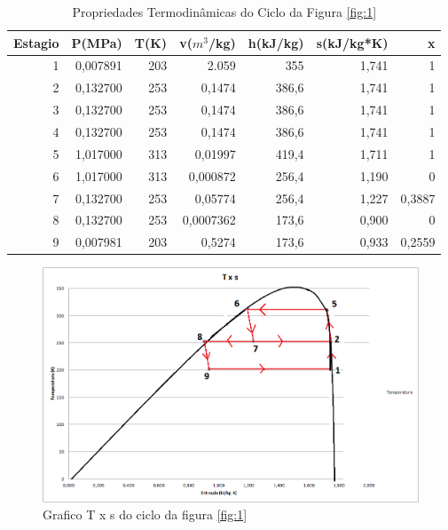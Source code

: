 \documentclass[a4paper, 12pt]{article}
\begin{document}
\begin{table}[htbp]
  \centering
  \caption{ Propriedades Termodinâmicas do Ciclo da Figura \ref{fig:1}}
    \begin{tabular}{rrrrrrr}
    \toprule
    Estagio & P(MPa) & T(K)  & v($m^{3}$/kg) & h(kJ/kg) & s(kJ/kg*K) & x \\
    \midrule
    1     & 0,007891 & 203   & 2.059 & 355   & 1,741 & 1 \\
    2     & 0,132700 & 253   & 0,1474 & 386,6 & 1,741 & 1 \\
    3     & 0,132700 & 253   & 0,1474 & 386,6 & 1,741 & 1 \\
    4     & 0,132700 & 253   & 0,1474 & 386,6 & 1,741 & 1 \\
    5     & 1,017000 & 313   & 0,01997 & 419,4 & 1,711 & 1 \\
    6     & 1,017000 & 313   & 0,000872 & 256,4 & 1,190 & 0 \\
    7     & 0,132700 & 253   & 0,05774 & 256,4 & 1,227 & 0,3887 \\
    8     & 0,132700 & 253   & 0,0007362 & 173,6 & 0,900 & 0 \\
    9     & 0,007981 & 203   & 0,5274 & 173,6 & 0,933 & 0,2559 \\
    \bottomrule
    \end{tabular}%
  \label{tab:1}%
\end{table}%

\begin{figure}[h]
\begin{center}
\includegraphics[scale=0.4]{./fig/4.png}
\caption{\label{fig:4}Grafico T x s do ciclo da figura \ref{fig:1}} 
\end{center}
\end{figure}
\end{document}
